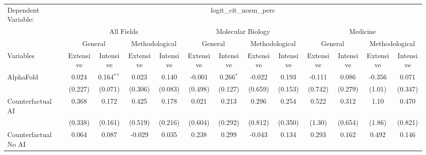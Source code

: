 \begingroup
\centering
\begin{tabular}{lcccccccccccc}
   \tabularnewline \midrule \midrule
   Dependent Variable: & \multicolumn{12}{c}{logit\_cit\_norm\_perc}\\
 & \multicolumn{4}{c}{All Fields} & \multicolumn{4}{c}{Molecular Biology} & \multicolumn{4}{c}{Medicine} \\
\cmidrule(lr){2-5} \cmidrule(lr){6-9} \cmidrule(lr){10-13}
 & \multicolumn{2}{c}{General} & \multicolumn{2}{c}{Methodological} & \multicolumn{2}{c}{General} & \multicolumn{2}{c}{Methodological} & \multicolumn{2}{c}{General} & \multicolumn{2}{c}{Methodological} \\
\cmidrule(lr){2-3} \cmidrule(lr){4-5} \cmidrule(lr){6-7} \cmidrule(lr){8-9} \cmidrule(lr){10-11} \cmidrule(lr){12-13}
Variables & \multicolumn{1}{c}{Extensive} & \multicolumn{1}{c}{Intensive} & \multicolumn{1}{c}{Extensive} & \multicolumn{1}{c}{Intensive} & \multicolumn{1}{c}{Extensive} & \multicolumn{1}{c}{Intensive} & \multicolumn{1}{c}{Extensive} & \multicolumn{1}{c}{Intensive} & \multicolumn{1}{c}{Extensive} & \multicolumn{1}{c}{Intensive} & \multicolumn{1}{c}{Extensive} & \multicolumn{1}{c}{Intensive} \\
\cmidrule(lr){1-1}\cmidrule(lr){2-2} \cmidrule(lr){3-3} \cmidrule(lr){4-4} \cmidrule(lr){5-5} \cmidrule(lr){6-6} \cmidrule(lr){7-7} \cmidrule(lr){8-8} \cmidrule(lr){9-9} \cmidrule(lr){10-10} \cmidrule(lr){11-11} \cmidrule(lr){12-12} \cmidrule(lr){13-13}
   AlphaFold                                & 0.024       & 0.164$^{**}$  & 0.023   & 0.140   & -0.001  & 0.266$^{*}$    & -0.022  & 0.193         & -0.111  & 0.086         & -0.356 & 0.071\\   
                                            & (0.227)     & (0.071)       & (0.306) & (0.083) & (0.498) & (0.127)        & (0.659) & (0.153)       & (0.742) & (0.279)       & (1.01) & (0.347)\\   
   Counterfactual AI                        & 0.368       & 0.172         & 0.425   & 0.178   & 0.021   & 0.213          & 0.296   & 0.254         & 0.522   & 0.312         & 1.10   & 0.470\\   
                                            & (0.338)     & (0.161)       & (0.519) & (0.216) & (0.604) & (0.292)        & (0.812) & (0.350)       & (1.30)  & (0.654)       & (1.86) & (0.821)\\   
   Counterfactual No AI                     & 0.064       & 0.087         & -0.029  & 0.035   & 0.238   & 0.299          & -0.043  & 0.134         & 0.293   & 0.162         & 0.492  & 0.146\\   

\end{tabular}
